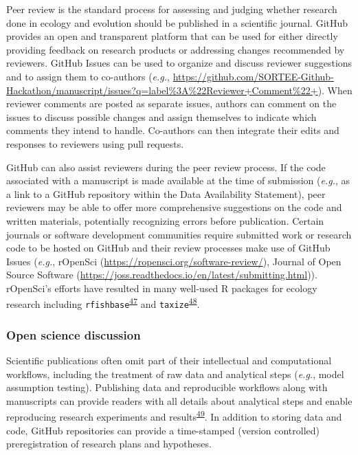 Peer review is the standard process for assessing and judging whether research done in ecology and evolution should be published in a scientific journal.
GitHub provides an open and transparent platform that can be used for either directly providing feedback on research products or addressing changes recommended by reviewers.
GitHub Issues can be used to organize and discuss reviewer suggestions and to assign them to co-authors (\emph{e.g.}, \url{https://github.com/SORTEE-Github-Hackathon/manuscript/issues?q=label\%3A\%22Reviewer+Comment\%22+}).
When reviewer comments are posted as separate issues, authors can comment on the issues to discuss possible changes and assign themselves to indicate which comments they intend to handle.
Co-authors can then integrate their edits and responses to reviewers using pull requests.

GitHub can also assist reviewers during the peer review process.
If the code associated with a manuscript is made available at the time of submission (\emph{e.g.}, as a link to a GitHub repository within the Data Availability Statement), peer reviewers may be able to offer more comprehensive suggestions on the code and written materials, potentially recognizing errors before publication.
Certain journals or software development communities require submitted work or research code to be hosted on GitHub and their review processes make use of GitHub Issues (\emph{e.g.}, rOpenSci (\url{https://ropensci.org/software-review/}), Journal of Open Source Software (\url{https://joss.readthedocs.io/en/latest/submitting.html})).
rOpenSci's efforts have resulted in many well-used R packages for ecology research including \texttt{rfishbase}\textsuperscript{\protect\hyperlink{ref-Xsdcv6q}{47}} and \texttt{taxize}\textsuperscript{\protect\hyperlink{ref-FVBWKkZu}{48}}.

\hypertarget{open-science-discussion}{%
\subsubsection{Open science discussion}\label{open-science-discussion}}

Scientific publications often omit part of their intellectual and computational workflows, including the treatment of raw data and analytical steps (\emph{e.g.}, model assumption testing).
Publishing data and reproducible workflows along with manuscripts can provide readers with all details about analytical steps and enable reproducing research experiments and results\textsuperscript{\protect\hyperlink{ref-NOgBWVAr}{49}}.
In addition to storing data and code, GitHub repositories can provide a time-stamped (version controlled) preregistration of research plans and hypotheses.


